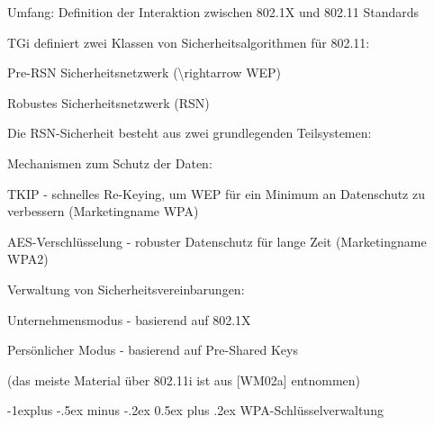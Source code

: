 \documentclass[a4paper]{article}
\makeatletter
\renewcommand{\subsection}{\@startsection{subsection}{2}{0mm}%
 {-1explus -.5ex minus -.2ex}%
 {0.5ex plus .2ex}%
 {\normalfont\normalsize\bfseries}}
\makeatother
\begin{document}
\begin{multicols}{3}
      \begin{itemize*}
            \item Umfang: Definition der Interaktion zwischen 802.1X und 802.11
            Standards
            \item TGi definiert zwei Klassen von Sicherheitsalgorithmen für 802.11:
            \begin{itemize*}
                  \item Pre-RSN Sicherheitsnetzwerk (\textbackslash rightarrow WEP)
                  \item Robustes Sicherheitsnetzwerk (RSN)
            \end{itemize*}
            \item Die RSN-Sicherheit besteht aus zwei grundlegenden Teilsystemen:
            \begin{itemize*}
                  \item Mechanismen zum Schutz der Daten:
                  \begin{itemize*} \item TKIP - schnelles Re-Keying, um WEP für ein Minimum an Datenschutz zu verbessern (Marketingname WPA) \item AES-Verschlüsselung - robuster Datenschutz für lange Zeit (Marketingname WPA2) \end{itemize*}
            \end{itemize*}
            \item Verwaltung von Sicherheitsvereinbarungen:
            \begin{itemize*}
                  \item Unternehmensmodus - basierend auf 802.1X
                  \item Persönlicher Modus - basierend auf Pre-Shared Keys
            \end{itemize*}
      \end{itemize*}

      (das meiste Material über 802.11i ist aus {[}WM02a{]} entnommen)


      \subsection{WPA-Schlüsselverwaltung}


\end{multicols}
\end{document}
